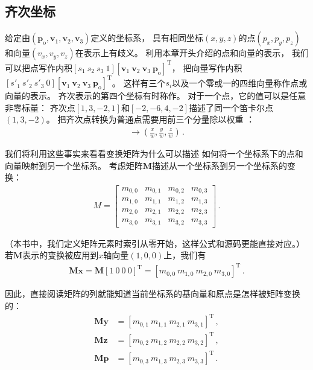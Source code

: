 \subsection{齐次坐标}\label{sub:齐次坐标}
给定由$(\bm p_\mathrm{o},\bm v_1,\bm v_2,\bm v_3)$定义的坐标系，
具有相同坐标$(x,y,z)$的点$(p_x,p_y,p_z)$和向量$(v_x,v_y,v_z)$在表示上有歧义。
利用本章开头介绍的点和向量的表示，
我们可以把点写作内积$[s_1\ s_2\ s_3\ 1][\bm v_1\ \bm v_2\ \bm v_3\ \bm p_\mathrm{o}]^\mathrm{T}$，
把向量写作内积$[s'_1\ s'_2\ s'_3\ 0][\bm v_1\ \bm v_2\ \bm v_3\ \bm p_\mathrm{o}]^\mathrm{T}$。
这样有三个$s_i$以及一个零或一的四维向量称作点或向量的表示。
齐次表示的第四个坐标有时称作。
对于一个点，它的值可以是任意非零标量：
齐次点$[1,3,-2,1]$和$[-2,-6,4,-2]$描述了同一个笛卡尔点$(1,3,-2)$。
把齐次点转换为普通点需要用前三个分量除以权重
：
\begin{align*}
    [x,y,z,w]\rightarrow\left(\frac{x}{w},\frac{y}{w},\frac{z}{w}\right)\, .
\end{align*}

我们将利用这些事实来看看变换矩阵为什么可以描述
如何将一个坐标系下的点和向量映射到另一个坐标系。
考虑矩阵$\bm M$描述从一个坐标系到另一个坐标系的变换：
\begin{align*}
    M=\left[
        \begin{array}{cccc}
            m_{0,0} & m_{0,1} & m_{0,2} & m_{0,3} \\
            m_{1,0} & m_{1,1} & m_{1,2} & m_{1,3} \\
            m_{2,0} & m_{2,1} & m_{2,2} & m_{2,3} \\
            m_{3,0} & m_{3,1} & m_{3,2} & m_{3,3}
        \end{array}
        \right]\, .
\end{align*}

（本书中，我们定义矩阵元素时索引从零开始，这样公式和源码更能直接对应。）
若$\bm M$表示的变换被应用到$x$轴向量$(1,0,0)$上，我们有
\begin{align*}
    \bm M\bm x=\bm M[1\ 0\ 0\ 0]^\mathrm{T}=[m_{0,0}\ m_{1,0}\ m_{2,0}\ m_{3,0}]^\mathrm{T}\, .
\end{align*}

因此，直接阅读矩阵的列就能知道当前坐标系的基向量和原点是怎样被矩阵变换的：
\begin{align*}
    \bm M\bm y & =[m_{0,1}\ m_{1,1}\ m_{2,1}\ m_{3,1}]^\mathrm{T}\, , \\
    \bm M\bm z & =[m_{0,2}\ m_{1,2}\ m_{2,2}\ m_{3,2}]^\mathrm{T}\, , \\
    \bm M\bm p & =[m_{0,3}\ m_{1,3}\ m_{2,3}\ m_{3,3}]^\mathrm{T}\, .
\end{align*}

